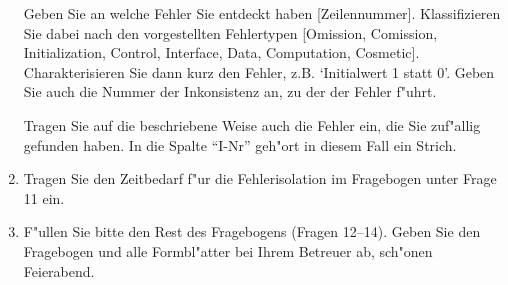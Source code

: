 \begin{enumerate}
Geben Sie an welche Fehler Sie entdeckt haben
[Zeilennummer]. Klassifizieren Sie dabei nach den vorgestellten
Fehlertypen [{Omission, Comission}, {Initialization, Control,
Interface, Data, Computation, Cosmetic}]. Charakterisieren Sie dann 
kurz den Fehler, z.B. `Initialwert 1 statt 0'. Geben Sie auch die 
Nummer der Inkonsistenz an, zu der der Fehler f"uhrt.

Tragen Sie auf die beschriebene Weise auch die Fehler ein, die Sie zuf"allig 
gefunden haben. In die Spalte "`I-Nr"' geh"ort in diesem Fall ein Strich.

\item Tragen Sie den Zeitbedarf f"ur die Fehlerisolation im Fragebogen
unter Frage 11 ein.

\item F"ullen Sie bitte den Rest des Fragebogens (Fragen 12--14). 
Geben Sie den Fragebogen und alle Formbl"atter bei Ihrem Betreuer ab,
sch"onen Feierabend.

\end{enumerate}

